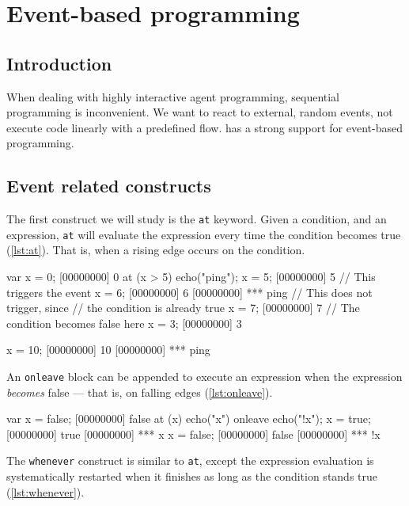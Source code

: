 
\chapter{Event-based programming}
\label{sec:event-prog}

\section{Introduction}

When dealing with highly interactive agent programming, sequential
programming is inconvenient. We want to react to external, random
events, not execute code linearly with a predefined flow. \urbi has a
strong support for event-based programming.

\section{Event related constructs}

The first construct we will study is the \lstinline|at| keyword. Given
a condition, and an expression, \lstinline|at| will evaluate the
expression every time the condition becomes true (\autoref{lst:at}). That is,
when a rising edge occurs on the condition.

\begin{urbiscript}[caption=Using \texttt{at}, label=lst:at]
var x = 0;
[00000000] 0
at (x > 5)
  echo("ping");
x = 5;
[00000000] 5
// This triggers the event
x = 6;
[00000000] 6
[00000000] *** ping
// This does not trigger, since
// the condition is already true
x = 7;
[00000000] 7
// The condition becomes false here
x = 3;
[00000000] 3

x = 10;
[00000000] 10
[00000000] *** ping
\end{urbiscript}

An \lstinline|onleave| block can be appended to execute an expression
when the expression \emph{becomes} false --- that is, on falling edges
(\autoref{lst:onleave}).

\begin{urbiscript}[caption=Using \texttt{at ... onleave}, label=lst:onleave]
var x = false;
[00000000] false
at (x)
  echo("x")
onleave
  echo("!x");
x = true;
[00000000] true
[00000000] *** x
x = false;
[00000000] false
[00000000] *** !x
\end{urbiscript}

The \lstinline|whenever| construct is similar to \lstinline|at|,
except the expression evaluation is systematically restarted when it
finishes as long as the condition stands true (\autoref{lst:whenever}).

